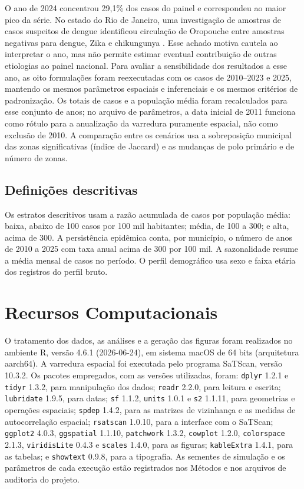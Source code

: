 O ano de 2024 concentrou 29,1\% dos casos do painel e correspondeu ao maior pico da série. No estado do Rio de Janeiro, uma investigação de amostras de casos suspeitos de dengue identificou circulação de Oropouche entre amostras negativas para dengue, Zika e chikungunya \cite{costa2025oropouche}. Esse achado motiva cautela ao interpretar o ano, mas não permite estimar eventual contribuição de outras etiologias ao painel nacional. Para avaliar a sensibilidade dos resultados a esse ano, as oito formulações foram reexecutadas com os casos de 2010--2023 e 2025, mantendo os mesmos parâmetros espaciais e inferenciais e os mesmos critérios de padronização. Os totais de casos e a população média foram recalculados para esse conjunto de anos; no arquivo de parâmetros, a data inicial de 2011 funciona como rótulo para a anualização da varredura puramente espacial, não como exclusão de 2010. A comparação entre os cenários usa a sobreposição municipal das zonas significativas (índice de Jaccard) e as mudanças de polo primário e de número de zonas.

\subsection{Definições descritivas}
\label{subsec:definicoes_descritivas}

Os estratos descritivos usam a razão acumulada de casos por população média: baixa, abaixo de 100 casos por 100 mil habitantes; média, de 100 a 300; e alta, acima de 300. A persistência epidêmica conta, por município, o número de anos de 2010 a 2025 com taxa anual acima de 300 por 100 mil. A sazonalidade resume a média mensal de casos no período. O perfil demográfico usa sexo e faixa etária dos registros do perfil bruto.

\section{Recursos Computacionais}
\label{sec:recursos}

O tratamento dos dados, as análises e a geração das figuras foram realizados no ambiente R, versão 4.6.1 (2026-06-24), em sistema macOS de 64 bits (arquitetura aarch64). A varredura espacial foi executada pelo programa SaTScan, versão 10.3.2. Os pacotes empregados, com as versões utilizadas, foram: \texttt{dplyr} 1.2.1 e \texttt{tidyr} 1.3.2, para manipulação dos dados; \texttt{readr} 2.2.0, para leitura e escrita; \texttt{lubridate} 1.9.5, para datas; \texttt{sf} 1.1.2, \texttt{units} 1.0.1 e \texttt{s2} 1.1.11, para geometrias e operações espaciais; \texttt{spdep} 1.4.2, para as matrizes de vizinhança e as medidas de autocorrelação espacial; \texttt{rsatscan} 1.0.10, para a interface com o SaTScan; \texttt{ggplot2} 4.0.3, \texttt{ggspatial} 1.1.10, \texttt{patchwork} 1.3.2, \texttt{cowplot} 1.2.0, \texttt{colorspace} 2.1.3, \texttt{viridisLite} 0.4.3 e \texttt{scales} 1.4.0, para as figuras; \texttt{kableExtra} 1.4.1, para as tabelas; e \texttt{showtext} 0.9.8, para a tipografia. As sementes de simulação e os parâmetros de cada execução estão registrados nos Métodos e nos arquivos de auditoria do projeto.

